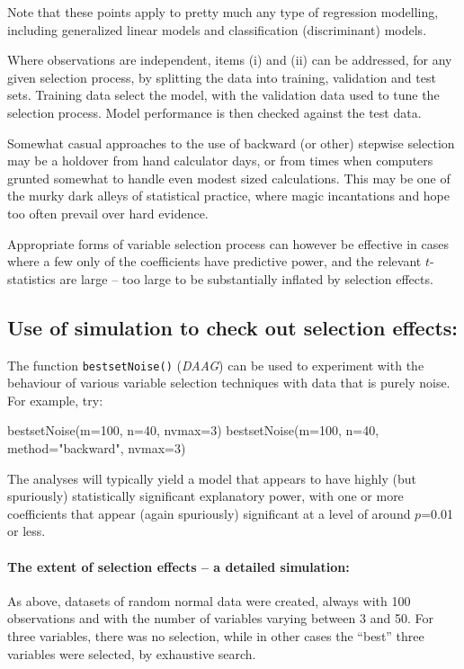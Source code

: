 \documentclass{tufte-book}\usepackage[]{graphicx}\usepackage[]{color}
\newcommand{\txtt}[1]{\texttt{#1}}
\begin{document}
Note that these points apply to pretty much any type of regression
modelling, including generalized linear models and classification
(discriminant) models.

Where observations are independent, items (i) and (ii) can be
addressed, for any given selection process, by splitting the data into
training, validation and test sets.  Training data select the model,
with the validation data used to tune the selection process.
Model performance is then checked against the test data.

Somewhat casual approaches to the use of backward (or other) stepwise
selection may be a holdover from hand calculator days, or from times
when computers grunted somewhat to handle even modest sized
calculations.  This may be one of the murky dark alleys of statistical
practice, where magic incantations and hope too often prevail over
hard evidence.

Appropriate forms of variable selection process can however be
effective in cases where a few only of the coefficients have
predictive power, and the relevant $t$-statistics are large --
too large to be substantially inflated by selection effects.

\subsection{Use of simulation to check out selection effects:}
The function \txtt{bestsetNoise()} ({\em DAAG}) can be used to
experiment with the behaviour of various variable selection techniques
with data that is purely noise.  For example, try:
\begin{Schunk}
\begin{Sinput}
bestsetNoise(m=100, n=40, nvmax=3)
bestsetNoise(m=100, n=40, method="backward",
             nvmax=3)
\end{Sinput}
\end{Schunk}
The analyses will typically yield a model that appears to
have highly (but spuriously) statistically significant explanatory power,
with one or more coefficients that appear (again spuriously)
significant at a level of around $p$=0.01 or less.

\paragraph{The extent of selection effects -- a detailed simulation:}
As above, datasets of random normal data were created, always with 100
observations and with the number of variables varying between 3 and
50.  For three variables, there was no selection, while in other cases
the ``best'' three variables were selected, by exhaustive search.
\end{document}
